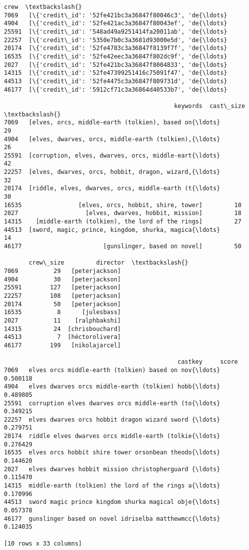 \documentclass[11pt]{article}
\begin{document}
\begin{tcolorbox}[breakable, size=fbox, boxrule=.5pt, pad at break*=1mm, opacityfill=0]
\begin{Verbatim}[commandchars=\\\{\}]
                                                    crew  \textbackslash{}
7069   [\{'credit\_id': '52fe421bc3a36847f80046c3', 'de{\ldots}
4904   [\{'credit\_id': '52fe421ac3a36847f80043ef', 'de{\ldots}
25591  [\{'credit\_id': '548ad49a9251414fa20011ab', 'de{\ldots}
22257  [\{'credit\_id': '5350e7b0c3a3681d93000e5d', 'de{\ldots}
20174  [\{'credit\_id': '52fe4783c3a36847f8139f7f', 'de{\ldots}
16535  [\{'credit\_id': '52fe42eec3a36847f802dc9f', 'de{\ldots}
2027   [\{'credit\_id': '52fe421bc3a36847f8004833', 'de{\ldots}
14315  [\{'credit\_id': '52fe47399251416c75091f47', 'de{\ldots}
44513  [\{'credit\_id': '52fe4475c3a36847f809731d', 'de{\ldots}
46177  [\{'credit\_id': '5912cf71c3a36864d40533b7', 'de{\ldots}

                                                keywords  cast\_size  \textbackslash{}
7069   [elves, orcs, middle-earth (tolkien), based on{\ldots}         29
4904   [elves, dwarves, orcs, middle-earth (tolkien),{\ldots}         26
25591  [corruption, elves, dwarves, orcs, middle-eart{\ldots}         42
22257  [elves, dwarves, orcs, hobbit, dragon, wizard,{\ldots}         32
20174  [riddle, elves, dwarves, orcs, middle-earth (t{\ldots}         30
16535                [elves, orcs, hobbit, shire, tower]         10
2027                   [elves, dwarves, hobbit, mission]         18
14315    [middle-earth (tolkien), the lord of the rings]         27
44513  [sword, magic, prince, kingdom, shurka, magica{\ldots}         14
46177                       [gunslinger, based on novel]         50

       crew\_size         director  \textbackslash{}
7069          29   [peterjackson]
4904          30   [peterjackson]
25591        127   [peterjackson]
22257        108   [peterjackson]
20174         50   [peterjackson]
16535          8      [julesbass]
2027          11    [ralphbakshi]
14315         24  [chrisbouchard]
44513          7  [héctorolivera]
46177        199   [nikolajarcel]

                                                 castkey     score
7069   elves orcs middle-earth (tolkien) based on nov{\ldots}  0.500118
4904   elves dwarves orcs middle-earth (tolkien) hobb{\ldots}  0.489805
25591  corruption elves dwarves orcs middle-earth (to{\ldots}  0.349215
22257  elves dwarves orcs hobbit dragon wizard sword {\ldots}  0.279751
20174  riddle elves dwarves orcs middle-earth (tolkie{\ldots}  0.276429
16535  elves orcs hobbit shire tower orsonbean theodo{\ldots}  0.144620
2027   elves dwarves hobbit mission christopherguard {\ldots}  0.115470
14315  middle-earth (tolkien) the lord of the rings a{\ldots}  0.170996
44513  sword magic prince kingdom shurka magical obje{\ldots}  0.057378
46177  gunslinger based on novel idriselba matthewmcc{\ldots}  0.124035

[10 rows x 33 columns]
\end{Verbatim}
\end{tcolorbox}
        
\end{document}
